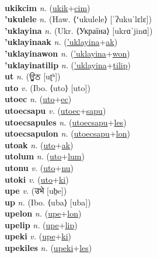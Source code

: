  \label{ukikak} \\
\textbf{ukikcim} \textit{n.} (\hyperref[ukik]{ukik}+\hyperref[cim]{cim})
 \label{ukikcim} \\
\textbf{'ukulele} \textit{n.} (Haw. ⟨ʻukulele⟩ [ˈʔukuˈlɛlɛ])
 \label{'ukulele} \\
\textbf{'uklayina} \textit{n.} (Ukr. ⟨Україна⟩ [ukrɑˈjinɑ])
 \label{'uklayina} \\
\textbf{'uklayinaak} \textit{n.} (\hyperref['uklayina]{'uklayina}+\hyperref[ak]{ak})
 \label{'uklayinaak} \\
\textbf{'uklayinawon} \textit{n.} (\hyperref['uklayina]{'uklayina}+\hyperref[won]{won})
 \label{'uklayinawon} \\
\textbf{'uklayinatilip} \textit{n.} (\hyperref['uklayina]{'uklayina}+\hyperref[tilip]{tilip})
 \label{'uklayinatilip} \\
\textbf{ut} \textit{n.} ({\gurmukhi{}ਊਠ} [uʈʰ])
 \label{ut} \\
\textbf{uto} \textit{v.} (Ibo. ⟨uto⟩ [uto])
 \label{uto} \\
\textbf{utoec} \textit{n.} (\hyperref[uto]{uto}+\hyperref[ec]{ec})
 \label{utoec} \\
\textbf{utoecsapu} \textit{v.} (\hyperref[utoec]{utoec}+\hyperref[sapu]{sapu})
 \label{utoecsapu} \\
\textbf{utoecsapules} \textit{n.} (\hyperref[utoecsapu]{utoecsapu}+\hyperref[les]{les})
 \label{utoecsapules} \\
\textbf{utoecsapulon} \textit{n.} (\hyperref[utoecsapu]{utoecsapu}+\hyperref[lon]{lon})
 \label{utoecsapulon} \\
\textbf{utoak} \textit{n.} (\hyperref[uto]{uto}+\hyperref[ak]{ak})
 \label{utoak} \\
\textbf{utolum} \textit{n.} (\hyperref[uto]{uto}+\hyperref[lum]{lum})
 \label{utolum} \\
\textbf{utonu} \textit{v.} (\hyperref[uto]{uto}+\hyperref[nu]{nu})
 \label{utonu} \\
\textbf{utoki} \textit{v.} (\hyperref[uto]{uto}+\hyperref[ki]{ki})
 \label{utoki} \\
\textbf{upe} \textit{v.} ({\devanagari{}उभे} [ub̤e])
 \label{upe} \\
\textbf{up} \textit{n.} (Ibo. ⟨uba⟩ [uba])
 \label{up} \\
\textbf{upelon} \textit{n.} (\hyperref[upe]{upe}+\hyperref[lon]{lon})
 \label{upelon} \\
\textbf{upelip} \textit{n.} (\hyperref[upe]{upe}+\hyperref[lip]{lip})
 \label{upelip} \\
\textbf{upeki} \textit{v.} (\hyperref[upe]{upe}+\hyperref[ki]{ki})
 \label{upeki} \\
\textbf{upekiles} \textit{n.} (\hyperref[upeki]{upeki}+\hyperref[les]{les})
 \label{upekiles} 

